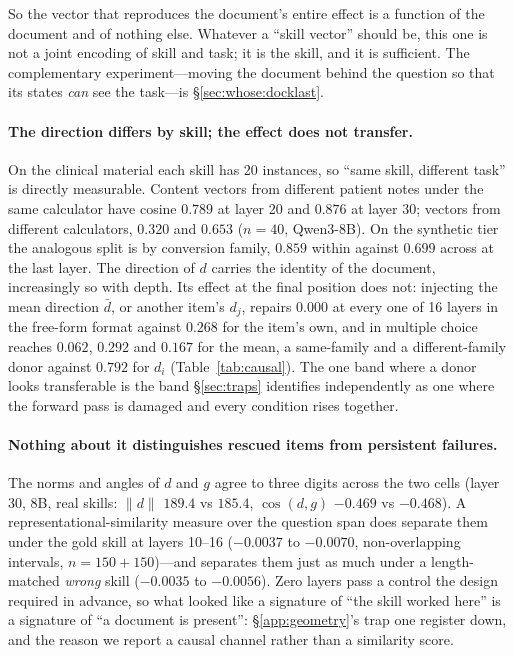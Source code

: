 \documentclass{article}
\newcommand{\dvec}{\ensuremath{d}}
\newcommand{\gvec}{\ensuremath{g}}
\begin{document}
So the vector that reproduces the document's entire effect is a function of the
document and of nothing else. Whatever a ``skill vector'' should be, this one is
not a joint encoding of skill and task; it is the skill, and it is sufficient.
The complementary experiment---moving the document behind the question so that
its states \emph{can} see the task---is \S\ref{sec:whose:docklast}.

\paragraph{The direction differs by skill; the effect does not transfer.}
On the clinical material each skill has 20 instances, so ``same skill, different
task'' is directly measurable. Content vectors from different patient notes under
the same calculator have cosine $0.789$ at layer 20 and $0.876$ at layer 30;
vectors from different calculators, $0.320$ and $0.653$ ($n=40$, Qwen3-8B). On
the synthetic tier the analogous split is by conversion family, $0.859$ within
against $0.699$ across at the last layer. The direction of $\dvec$ carries the
identity of the document, increasingly so with depth. Its effect at the final
position does not: injecting the mean direction $\bar{\dvec}$, or another item's
$\dvec_j$, repairs $0.000$ at every one of 16 layers in the free-form format
against $0.268$ for the item's own, and in multiple choice reaches $0.062$,
$0.292$ and $0.167$ for the mean, a same-family and a different-family donor
against $0.792$ for $\dvec_i$ (Table~\ref{tab:causal}). The one band where a
donor looks transferable is the band \S\ref{sec:traps} identifies independently
as one where the forward pass is damaged and every condition rises together.

\paragraph{Nothing about it distinguishes rescued items from persistent
failures.} The norms and angles of $\dvec$ and $\gvec$ agree to three digits
across the two cells (layer 30, 8B, real skills: $\|\dvec\|$ $189.4$ vs $185.4$,
$\cos(\dvec,\gvec)$ $-0.469$ vs $-0.468$). A representational-similarity measure
over the question span does separate them under the gold skill at layers 10--16
($-0.0037$ to $-0.0070$, non-overlapping intervals, $n=150+150$)---and separates
them just as much under a length-matched \emph{wrong} skill ($-0.0035$ to
$-0.0056$). Zero layers pass a control the design required in advance, so what
looked like a signature of ``the skill worked here'' is a signature of ``a
document is present'': \S\ref{app:geometry}'s trap one register down, and the
reason we report a causal channel rather than a similarity score.
\end{document}
